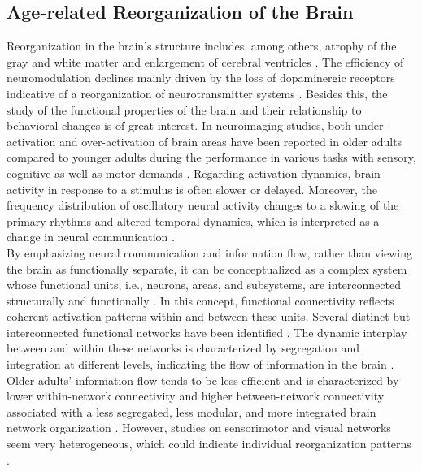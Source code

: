 \subsection{Age-related Reorganization of the Brain}
\label{theory:aging:brain}
Reorganization in the brain's structure includes, among others, atrophy of the gray and white matter and enlargement of cerebral ventricles \cite{Fjell2010}. The efficiency of neuromodulation declines mainly driven by the loss of dopaminergic receptors indicative of a reorganization of neurotransmitter systems \cite{Li2001}. Besides this, the study of the functional properties of the brain and their relationship to behavioral changes is of great interest. In neuroimaging studies, both under-activation and over-activation of brain areas have been reported in older adults compared to younger adults during the performance in various tasks with sensory, cognitive as well as motor demands \cite{Reuter-Lorenz2010, Sala-Llonch2015}. Regarding activation dynamics, brain activity in response to a stimulus is often slower or delayed. Moreover, the frequency distribution of oscillatory neural activity changes to a slowing of the primary rhythms and altered temporal dynamics, which is interpreted as a change in neural communication \cite{Courtney2021}.\\ 
By emphasizing neural communication and information flow, rather than viewing the brain as functionally separate, it can be conceptualized as a complex system whose functional units, i.e., neurons, areas, and subsystems, are interconnected structurally and functionally \cite{Friston2011,Deery2023}. In this concept, functional connectivity reflects coherent activation patterns within and between these units. Several distinct but interconnected functional networks have been identified \cite{Uddin2019}. The dynamic interplay between and within these networks is characterized by segregation and integration at different levels, indicating the flow of information in the brain \cite{Sporns2013}. Older adults' information flow tends to be less efficient and is characterized by lower within-network connectivity and higher between-network connectivity associated with a less segregated, less modular, and more integrated brain network organization \cite{Sala-Llonch2015,Deery2023, Betzel2014}. However, studies on sensorimotor and visual networks seem very heterogeneous, which could indicate individual reorganization patterns \cite{Deery2023}.

